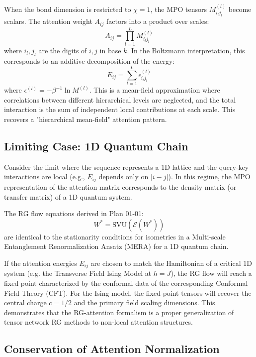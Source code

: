 When the bond dimension is restricted to $\chi = 1$, the MPO tensors $M^{(l)}_{i_l j_l}$ become scalars. The attention weight $A_{ij}$ factors into a product over scales:
\begin{equation}
    A_{ij} = \prod_{l=1}^L M^{(l)}_{i_l j_l}
\end{equation}
where $i_l, j_l$ are the digits of $i, j$ in base $k$. In the Boltzmann interpretation, this corresponds to an additive decomposition of the energy:
\begin{equation}
    E_{ij} = \sum_{l=1}^L \epsilon^{(l)}_{i_l j_l}
\end{equation}
where $\epsilon^{(l)} = -\beta^{-1} \ln M^{(l)}$. This is a mean-field approximation where correlations between different hierarchical levels are neglected, and the total interaction is the sum of independent local contributions at each scale. This recovers a "hierarchical mean-field" attention pattern.

\subsection{Limiting Case: 1D Quantum Chain}

Consider the limit where the sequence represents a 1D lattice and the query-key interactions are local (e.g., $E_{ij}$ depends only on $|i-j|$). In this regime, the MPO representation of the attention matrix corresponds to the density matrix (or transfer matrix) of a 1D quantum system.

The RG flow equations derived in Plan 01-01:
\begin{equation}
    W^* = \text{SVU}(\mathcal{E}(W^*))
\end{equation}
are identical to the stationarity conditions for isometries in a Multi-scale Entanglement Renormalization Ansatz (MERA) for a 1D quantum chain.

If the attention energies $E_{ij}$ are chosen to match the Hamiltonian of a critical 1D system (e.g. the Transverse Field Ising Model at $h=J$), the RG flow will reach a fixed point characterized by the conformal data of the corresponding Conformal Field Theory (CFT). For the Ising model, the fixed-point tensors will recover the central charge $c=1/2$ and the primary field scaling dimensions. This demonstrates that the RG-attention formalism is a proper generalization of tensor network RG methods to non-local attention structures.

\subsection{Conservation of Attention Normalization}

